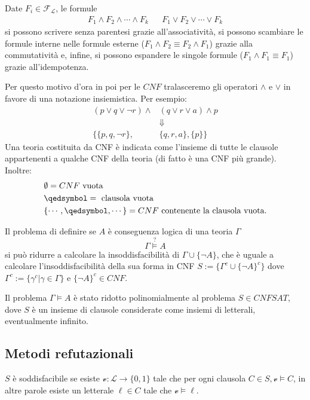 \begin{defi}
Date $F_i \in \mathscr{F}_\mathscr{L}$, le formule 
\begin{align*}
  F_1 \land F_2 \land \cdots \land F_k &&
  F_1 \lor F_2 \lor \cdots \lor F_k
\end{align*}
si possono scrivere senza parentesi grazie all'associatività, si possono scambiare le formule interne nelle formule esterne ($F_1 \land F_2 \equiv F_2 \land F_1$) grazie alla commutatività e, infine, si possono espandere le singole formule ($F_1 \land F_1  \equiv F_1$) grazie all'idempotenza.

Per questo motivo d'ora in poi per le $CNF$ tralasceremo gli operatori $\land$ e $\lor$ in favore di una notazione insiemistica. Per esempio:
\begin{align*}
  (p \lor q \lor \neg r) \land &(q \lor r \lor a) \land p \\
  & \Downarrow \\
  \{ \{p, q, \neg r\}, &\{q, r, a\}, \{p\}\}
\end{align*}
Una teoria costituita da CNF è indicata come l'insieme di tutte le clausole appartenenti a qualche CNF della teoria (di fatto è una CNF più grande). Inoltre:
\begin{align*}
  & \emptyset = CNF \text{ vuota} \\
  & \qedsymbol = \text{ clausola vuota} \\
  & \{\cdots, \qedsymbol, \cdots \} = CNF \text{ contenente la clausola vuota}.
\end{align*}
\end{defi}

Il problema di definire se $A$ è conseguenza logica di una teoria $\Gamma$ 
$$
\Gamma \stackrel{?}{\models} A
$$
si può ridurre a calcolare la insoddisfacibilità di $\Gamma \cup \{\neg A\}$, che è uguale a calcolare l'insoddisfacibilità della sua forma in CNF $S := \{\Gamma^c \cup \{\neg A\}^c\}$ dove $\Gamma^c := \{\gamma^c | \gamma \in \Gamma\}$ e $\{\neg A\}^c \in CNF$. 

Il problema $\Gamma \models A$ è stato ridotto polinomialmente al problema $S \in CNFSAT$,
dove $S$ è un insieme di clausole considerate come insiemi di letterali, 
eventualmente infinito.


\subsection{Metodi refutazionali}
$S$ è soddisfacibile se esiste $\mathcal{v}:\mathscr{L} \rightarrow \{0,1\}$ tale 
che per ogni clausola $C \in S, \mathcal{v} \models C$, in altre parole esiste un letterale $\ell \in C$ tale che $\mathcal{v} \models \ell$. 

